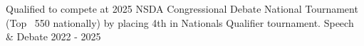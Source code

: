 



\begin{cventries}


  \cventry
    {Qualified to compete at 2025 NSDA Congressional Debate National Tournament (Top ~550 nationally) by placing 4th in Nationals Qualifier tournament.} %
    {Speech \& Debate } %
    {2022 - 2025}
    {}
    {}
\end{cventries}